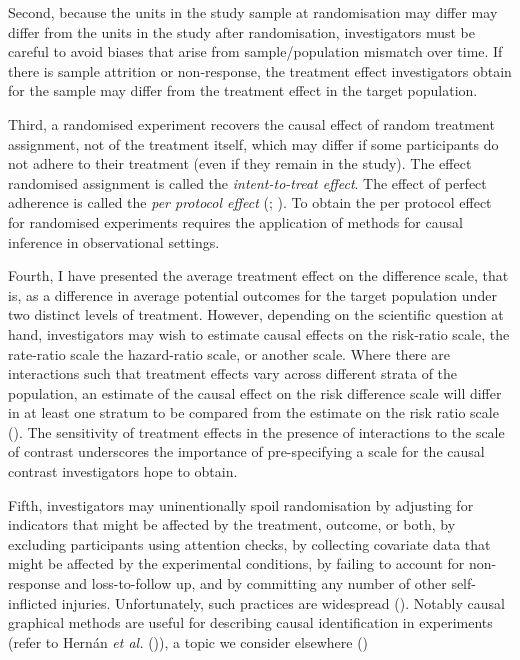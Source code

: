 \documentclass[
  single column]{article}
\begin{document}
Second, because the units in the study sample at randomisation may
differ may differ from the units in the study after randomisation,
investigators must be careful to avoid biases that arise from
sample/population mismatch over time. If there is sample attrition or
non-response, the treatment effect investigators obtain for the sample
may differ from the treatment effect in the target population.

Third, a randomised experiment recovers the causal effect of random
treatment assignment, not of the treatment itself, which may differ if
some participants do not adhere to their treatment (even if they remain
in the study). The effect randomised assignment is called the
\emph{intent-to-treat effect}. The effect of perfect adherence is called
the \emph{per protocol effect} (; ).
To obtain the per protocol effect for randomised experiments requires
the application of methods for causal inference in observational
settings.

Fourth, I have presented the average treatment effect on the difference
scale, that is, as a difference in average potential outcomes for the
target population under two distinct levels of treatment. However,
depending on the scientific question at hand, investigators may wish to
estimate causal effects on the risk-ratio scale, the rate-ratio scale
the hazard-ratio scale, or another scale. Where there are interactions
such that treatment effects vary across different strata of the
population, an estimate of the causal effect on the risk difference
scale will differ in at least one stratum to be compared from the
estimate on the risk ratio scale
(). The
sensitivity of treatment effects in the presence of interactions to the
scale of contrast underscores the importance of pre-specifying a scale
for the causal contrast investigators hope to obtain.

Fifth, investigators may uninentionally spoil randomisation by adjusting
for indicators that might be affected by the treatment, outcome, or
both, by excluding participants using attention checks, by collecting
covariate data that might be affected by the experimental conditions, by
failing to account for non-response and loss-to-follow up, and by
committing any number of other self-inflicted injuries. Unfortunately,
such practices are widespread (). Notably causal graphical methods are useful for
describing causal identification in experiments (refer to Hernán
\emph{et al.} ()), a topic we consider
elsewhere ()
\end{document}
